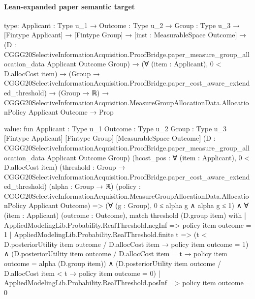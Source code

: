 \documentclass[10pt]{article}
\begin{document}
\paragraph{Lean-expanded paper semantic target}
\begin{ReviewVerbatim}
type:
{Applicant : Type u_1} →
  {Outcome : Type u_2} →
    {Group : Type u_3} →
      [Fintype Applicant] →
        [Fintype Group] →
          [inst : MeasurableSpace Outcome] →
            (D :
                CGGG20SelectiveInformationAcquisition.ProofBridge.paper_measure_group_allocation_data Applicant Outcome
                  Group) →
              (∀ (item : Applicant), 0 < D.allocCost item) →
                (Group → CGGG20SelectiveInformationAcquisition.ProofBridge.paper_cost_aware_extended_threshold) →
                  (Group → ℝ) →
                    CGGG20SelectiveInformationAcquisition.MeasureGroupAllocationData.AllocationPolicy Applicant
                        Outcome →
                      Prop

value:
fun {Applicant : Type u_1} {Outcome : Type u_2} {Group : Type u_3} [Fintype Applicant] [Fintype Group]
    [MeasurableSpace Outcome]
    (D : CGGG20SelectiveInformationAcquisition.ProofBridge.paper_measure_group_allocation_data Applicant Outcome Group)
    (hcost_pos : ∀ (item : Applicant), 0 < D.allocCost item)
    (threshold : Group → CGGG20SelectiveInformationAcquisition.ProofBridge.paper_cost_aware_extended_threshold)
    (alpha : Group → ℝ)
    (policy : CGGG20SelectiveInformationAcquisition.MeasureGroupAllocationData.AllocationPolicy Applicant Outcome) =>
  (∀ (g : Group), 0 ≤ alpha g ∧ alpha g ≤ 1) ∧
    ∀ (item : Applicant) (outcome : Outcome),
      match threshold (D.group item) with
      | AppliedModelingLib.Probability.RealThreshold.negInf => policy item outcome = 1
      | AppliedModelingLib.Probability.RealThreshold.finite t =>
        (t < D.posteriorUtility item outcome / D.allocCost item → policy item outcome = 1) ∧
          (D.posteriorUtility item outcome / D.allocCost item = t → policy item outcome = alpha (D.group item)) ∧
            (D.posteriorUtility item outcome / D.allocCost item < t → policy item outcome = 0)
      | AppliedModelingLib.Probability.RealThreshold.posInf => policy item outcome = 0
\end{ReviewVerbatim}
\end{document}
